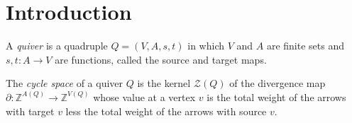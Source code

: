 \section{Introduction}\label{Arden24-sec-1}

\begin{definition}\label{Arden24-def-1.1}
\label{Arden24-def:quiver}
A \emph{quiver} is a quadruple $Q = (V, A, s, t)$ in which $V$ and $A$ are finite sets and $s, t \colon A \to V$ are functions, called the source and target maps.
\end{definition}

\begin{definition}\label{Arden24-def-1.2}
\label{Arden24-def:cycle-space}
The \emph{cycle space} of a quiver $Q$ is the kernel $\mathcal{Z}(Q)$ of the divergence map $\partial \colon \mathbb{Z}^{A(Q)} \to \mathbb{Z}^{V(Q)}$ whose value at a vertex $v$ is the total weight of the arrows with target $v$ less the total weight of the arrows with source $v$.
\end{definition}

